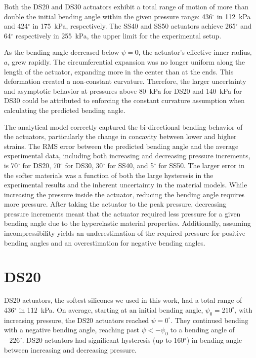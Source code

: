 Both the DS20 and DS30 actuators exhibit a total range of motion of more than double the initial bending angle within the given pressure range: 436$^\circ$ in 112~kPa and 424$^\circ$ in 175~kPa, respectively. The SS40 and SS50 actuators achieve 265$^\circ$ and 64$^\circ$ respectively in 255~kPa, the upper limit for the experimental setup.

As the bending angle decreased below $\psi=0$, the actuator's effective inner radius, $a$, grew rapidly. The circumferential expansion was no longer uniform along the length of the actuator, expanding more in the center than at the ends. This deformation created a non-constant curvature. Therefore, the larger uncertainty and asymptotic behavior at pressures above 80~kPa for DS20 and 140~kPa for DS30 could be attributed to enforcing the constant curvature assumption when calculating the predicted bending angle. 

The analytical model correctly captured the bi-directional bending behavior of the actuators, particularly the change in concavity between lower and higher strains. The RMS error between the predicted bending angle and the average experimental data, including both increasing and decreasing pressure increments, is 70$^\circ$ for DS20, 70$^\circ$ for DS30, 30$^\circ$ for SS40, and 5$^\circ$ for SS50. The larger error in the softer materials was a function of both the large hysteresis in the experimental results and the inherent uncertainty in the material models. While increasing the pressure inside the actuator, reducing the bending angle requires more pressure. After taking the actuator to the peak pressure, decreasing pressure increments meant that the actuator required less pressure for a given bending angle due to the hyperelastic material properties. Additionally, assuming incompressibility yields an underestimation of the required pressure for positive bending angles and an overestimation for negative bending angles. 

\clearpage  
\section{DS20}

DS20 actuators, the softest silicones we used in this work, had a total range of 436$^\circ$ in 112~kPa. On average, starting at an initial bending angle, $\psi_0=210^\circ$, with increasing pressure, the DS20 actuators reached $\psi=0^\circ$. They continued bending with a negative bending angle, reaching past $\psi<-\psi_0$ to a bending angle of $-226^\circ$. DS20 actuators had significant hysteresis (up to 160$^\circ$) in bending angle between increasing and decreasing pressure.

